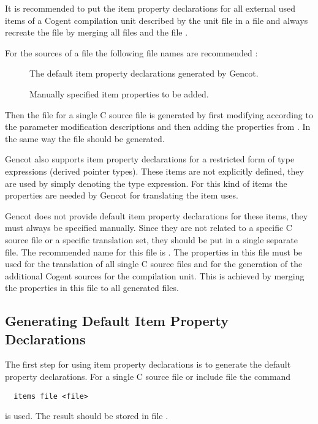 It is recommended to put the item property declarations for all external used items of a Cogent compilation unit described by
the unit file  in a file  and always recreate the file  by merging all
files  and the file .

For the sources of a file  the following file names are recommended :
\begin{description}
\item[] The default item property declarations generated by Gencot.
\item[] Manually specified item properties to be added. 
\end{description}
Then the file  for a single C source file is generated by first modifying  
according to the parameter modification descriptions and then adding the properties from . In the same
way the file  should be generated.

Gencot also supports item property declarations for a restricted form of type expressions (derived pointer types). These items
are not explicitly defined, they are used by simply denoting the type expression. For this kind of items the properties are 
needed by Gencot for translating the item uses. 

Gencot does not provide default item property declarations for these items, they must always be specified manually. Since they 
are not related to a specific C source file or a specific translation set, they should be put in a single separate file. The 
recommended name for this file is . The properties in this file must be used for the translation 
of all single C source files and for the generation of the additional Cogent sources for the compilation unit. This is 
achieved by merging the properties in this file to all generated  files.

\subsection{Generating Default Item Property Declarations}
\label{app-items-default}

The first step for using item property declarations is to generate the default property declarations. For a single C source 
file or include file  the command
\begin{verbatim}
  items file <file>
\end{verbatim}
is used. The result should be stored in file .

